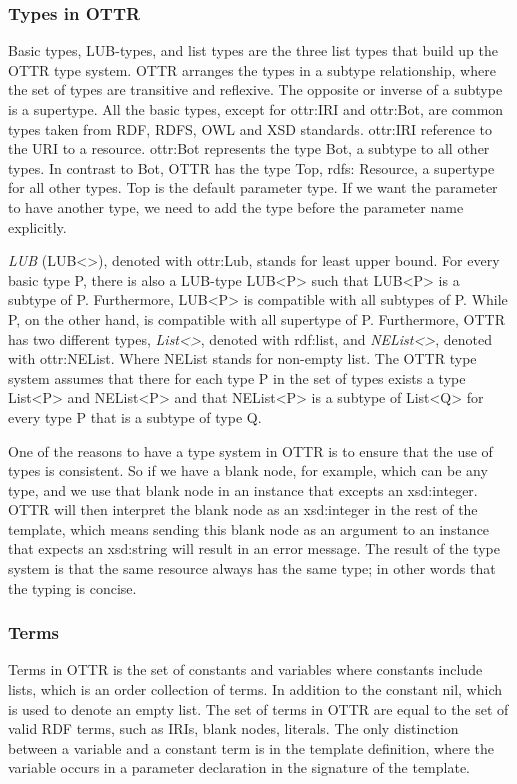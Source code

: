 \subsubsection{Types in OTTR}
Basic types, LUB-types, and list types are the three list types that build up the OTTR type system. OTTR arranges the types in a subtype relationship, where the set of types are transitive and reflexive. The opposite or inverse of a subtype is a supertype. All the basic types, except for ottr:IRI and ottr:Bot, are common types taken from RDF, RDFS, OWL and XSD standards. ottr:IRI reference to the URI to a resource. ottr:Bot represents the type Bot, a subtype to all other types. In contrast to Bot, OTTR has the type Top, rdfs: Resource, a supertype for all other types.  Top is the default parameter type. If we want the parameter to have another type, we need to add the type before the parameter name explicitly.


\para
\emph{LUB} (LUB<>), denoted with ottr:Lub, stands for least upper bound. For every basic type P, there is also a LUB-type LUB<P> such that LUB<P> is a subtype of P. Furthermore, LUB<P> is compatible with all subtypes of P. While P, on the other hand, is compatible with all supertype of P. Furthermore, OTTR has two different types, \emph{List<>}, denoted with rdf:list, and \emph{NEList<>}, denoted with ottr:NEList. Where NEList stands for non-empty list. The OTTR type system assumes that there for each type P in the set of types exists a type List<P> and NEList<P> and that NEList<P> is a subtype of List<Q> for every type P that is a subtype of type Q.


\para
One of the reasons to have a type system in OTTR is to ensure that the use of types is consistent. So if we have a blank node, for example, which can be any type, and we use that blank node in an instance that excepts an xsd:integer. OTTR will then interpret the blank node as an xsd:integer in the rest of the template, which means sending this blank node as an argument to an instance that expects an xsd:string will result in an error message. The result of the type system is that the same resource always has the same type; in other words that the typing is concise. 

\subsubsection{Terms}
Terms in OTTR is the set of constants and variables where constants include lists, which is an order collection of terms. In addition to the constant nil, which is used to denote an empty list. The set of terms in OTTR are equal to the set of valid RDF terms, such as IRIs, blank nodes, literals. The only distinction between a variable and a constant term is in the template definition, where the variable occurs in a parameter declaration in the signature of the template.